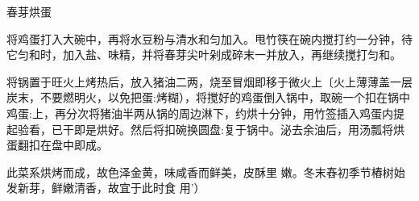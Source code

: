 \begin{recipe}{春芽烘蛋}

\ingredients


\cooking

\step 将鸡蛋打入大碗中，再将水豆粉与清水和匀加入。甩竹筷在碗内搅打约一分钟，待它匀和时，加入盐、味精，并将春芽尖叶剁成碎末一并放入，再继续搅打匀和。

\step 将锅置于旺火上烤热后，放入猪油二两，烧至冒烟即移于微火上〔火上薄薄盖一层炭末，不要燃明火，以免把蛋:烤糊），将搅好的鸡蛋倒入锅中，取碗一个扣在锅中鸡蛋:上，再分次将猪油半两从锅的周边淋下，约烘十分钟，用竹签插入鸡蛋内提起验看，已干即是烘好。然后将扣碗换圆盘:复于锅中。泌去余油后，用汤瓢将烘蛋翻扣在盘中即成。

\notes

此菜系烘烤而成，故色泽金黄，味咸香而鲜美，皮酥里 嫩。冬末舂初季节樁树始发新芽，鲜嫩清香，故宜于此时食 用'）

\end{recipe}

